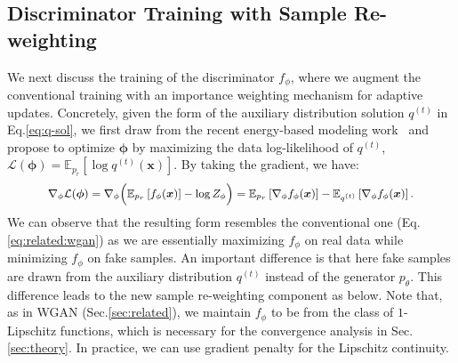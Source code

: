 \documentclass{article}
\newcommand{\0}{\bm{0}}
\newcommand{\E}{\mathbb{E}}
\newcommand{\x}{\bm{x}}
\begin{document}
\subsection{Discriminator Training with Sample Re-weighting}\label{sec:method:dis}

We next discuss the training of the discriminator $f_\phi$, where we augment the conventional training with an importance weighting mechanism for adaptive updates. 
Concretely, given the form of the auxiliary distribution solution $q^{(t)}$ in Eq.\eqref{eq:q-sol}, we first draw from the recent energy-based modeling work~\cite{kim2016deep,hu2018deep} and propose to optimize $\bm{\phi}$ by maximizing the data log-likelihood of $q^{(t)}$, $\mathcal{L}(\bm{\phi})=\E_{p_r}[\log q^{(t)}(\x)]$. By taking the gradient, we have: \begin{equation}
\small
\begin{split}
    \nabla_\phi \mathcal{L}(\bm{\phi}) = \nabla_\phi \Big( \E_{p_r}\left[ f_\phi(\x)  \right] - \log Z_\phi \Big) 
    = \E_{p_r}\left[ \nabla_\phi  f_\phi(\x)  \right] -  \E_{q^{(t)}}\left[ \nabla_\phi f_\phi(\x) \right].
\end{split}
\label{eq:d-grad}
\end{equation}
We can observe that the resulting form resembles the conventional one (Eq.\ref{eq:related:wgan}) as we are essentially maximizing $f_\phi$ on real data while minimizing $f_\phi$ on fake samples. An important difference is that here fake samples are drawn from the auxiliary distribution $q^{(t)}$ instead of the generator $p_\theta$. This  difference leads to the new sample re-weighting component as below. Note that, as in WGAN (Sec.\ref{sec:related}), we maintain $f_\phi$ to be from the class of $1$-Lipschitz functions, which is necessary for the convergence analysis in Sec.\ref{sec:theory}. In practice, we can use gradient penalty \cite{wgangp,wwgan} for the Lipschitz continuity.
\end{document}
